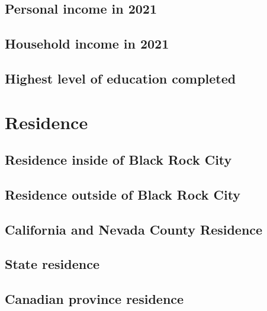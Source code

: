 \documentclass[
]{book}
\begin{document}
\hypertarget{personal-income-in-2021}{%
\subsection{Personal income in 2021}\label{personal-income-in-2021}}

\hypertarget{household-income-in-2021}{%
\subsection{Household income in 2021}\label{household-income-in-2021}}

\hypertarget{highest-level-of-education-completed}{%
\subsection{Highest level of education completed}\label{highest-level-of-education-completed}}

\hypertarget{residence}{%
\section{Residence}\label{residence}}

\hypertarget{residence-inside-of-black-rock-city}{%
\subsection{Residence inside of Black Rock City}\label{residence-inside-of-black-rock-city}}

\hypertarget{residence-outside-of-black-rock-city}{%
\subsection{Residence outside of Black Rock City}\label{residence-outside-of-black-rock-city}}

\hypertarget{california-and-nevada-county-residence}{%
\subsection{California and Nevada County Residence}\label{california-and-nevada-county-residence}}

\hypertarget{state-residence}{%
\subsection{State residence}\label{state-residence}}

\hypertarget{canadian-province-residence}{%
\subsection{Canadian province residence}\label{canadian-province-residence}}
\end{document}
